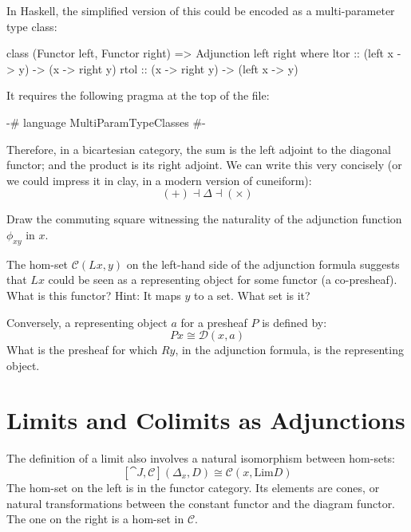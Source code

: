 \documentclass[DaoFP]{subfiles}
\begin{document}
In Haskell, the simplified version of this could be encoded as a multi-parameter type class:
\begin{haskell}
class (Functor left, Functor right) => Adjunction left right where
  ltor :: (left x -> y) -> (x -> right y)
  rtol :: (x -> right y) -> (left x -> y)
\end{haskell}
It requires the following pragma at the top of the file:
\begin{haskell}
{-# language MultiParamTypeClasses #-}
\end{haskell}



Therefore, in a bicartesian category, the sum is the left adjoint to the diagonal functor; and the product is its right adjoint. We can write this very concisely (or we could impress it in clay, in a modern version of cuneiform):
\[ (+) \dashv \Delta \dashv (\times) \]

\begin{exercise}
Draw the commuting square witnessing the naturality of the adjunction function $\phi_{x y}$ in $x$.
\end{exercise}

\begin{exercise}
The hom-set $\mathcal{C} (L x, y)$ on the left-hand side of the adjunction formula suggests that $L x$ could be seen as a representing object for some functor (a co-presheaf). What is this functor? Hint: It maps $y$ to a set. What set is it?
\end{exercise}

\begin{exercise}
Conversely, a representing object $a$ for a presheaf $P$ is defined by:
\[P x \cong \mathcal{D}(x, a)\]
What is the presheaf for which $R y$, in the adjunction formula, is the representing object.
\end{exercise}

\section{Limits and Colimits as Adjunctions}

The definition of a limit also involves a natural isomorphism between hom-sets:
\[ [\cat J, \mathcal{C}](\Delta_x, D)  \cong \mathcal{C}(x, \text{Lim} D) \]
The hom-set on the left is in the functor category. Its elements are cones, or natural transformations between the constant functor and the diagram functor. The one on the right is a hom-set in $\mathcal{C}$. 
\end{document}
